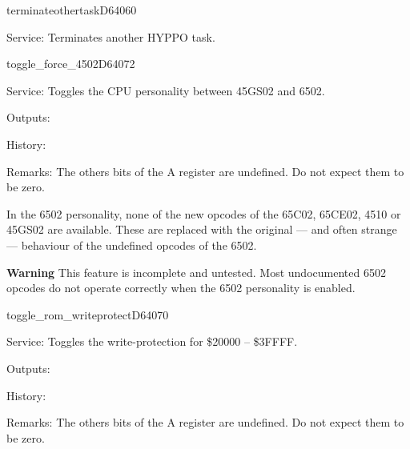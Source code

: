 \begin{hyppotrap}{terminateothertask}{D640}{60}
\item [Service:]
  Terminates another HYPPO task.
\notimplemented
\end{hyppotrap}


\newpage
\begin{hyppotrap}{toggle\_force\_4502}{D640}{72}
\item [Service:]
  Toggles the CPU personality between 45GS02 and 6502.
\item [Outputs:]
\item [History:]
\item [Remarks:]
  The others bits of the A register are undefined. Do not expect them to be
  zero.

  In the 6502 personality, none of the new opcodes of the 65C02, 65CE02, 4510
  or 45GS02 are available. These are replaced with the original --- and often
  strange --- behaviour of the undefined opcodes of the 6502.

  \textbf{Warning} This feature is incomplete and untested. Most undocumented
  6502 opcodes do not operate correctly when the 6502 personality is enabled.
\end{hyppotrap}


\newpage
\begin{hyppotrap}{toggle\_rom\_writeprotect}{D640}{70}
\item [Service:]
  Toggles the write-protection for \$20000 -- \$3FFFF.
\item [Outputs:]
\item [History:]
\item [Remarks:]
  The others bits of the A register are undefined. Do not expect them to be
  zero.
\end{hyppotrap}


